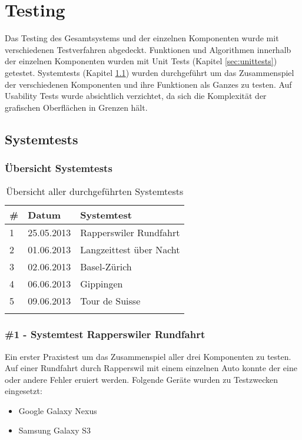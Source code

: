 \section{Testing}
Das Testing des Gesamtsystems und der einzelnen Komponenten wurde mit verschiedenen Testverfahren abgedeckt. Funktionen und Algorithmen innerhalb der einzelnen Komponenten wurden mit Unit Tests (Kapitel \ref{sec:unittests}) getestet. Systemtests (Kapitel \ref{sec:systemtests}) wurden durchgeführt um das Zusammenspiel der verschiedenen Komponenten und ihre Funktionen als Ganzes zu testen. Auf Usability Tests wurde absichtlich verzichtet, da sich die Komplexität der grafischen Oberflächen in Grenzen hält. 

\subsection{Systemtests}
\label{sec:systemtests}

\subsubsection{Übersicht Systemtests}
\begin{longtable}{p{0.3cm}|p{1.8cm}|p{9.3cm}}
\hline 
\textbf{\#} & \textbf{Datum} & \textbf{Systemtest} \\ 
\hline 
1 & 25.05.2013 & Rapperswiler Rundfahrt \\
\hline 
2 & 01.06.2013 & Langzeittest über Nacht \\ 
\hline 
3 & 02.06.2013 & Basel-Zürich \\ 
\hline 
4 & 06.06.2013 & Gippingen \\ 
\hline 
5 & 09.06.2013 & Tour de Suisse \\ 
\hline 
\caption{Übersicht aller durchgeführten Systemtests}
\end{longtable} 

\subsubsection{\#1 - Systemtest Rapperswiler Rundfahrt}
Ein erster Praxistest um das Zusammenspiel aller drei Komponenten zu testen. Auf einer Rundfahrt durch Rapperswil mit einem einzelnen Auto konnte der eine oder andere Fehler eruiert werden. Folgende Geräte wurden zu Testzwecken eingesetzt:
\begin{itemize} [noitemsep,topsep=0pt]
	\item{Google Galaxy Nexus}
	\item{Samsung Galaxy S3}
\end{itemize}

